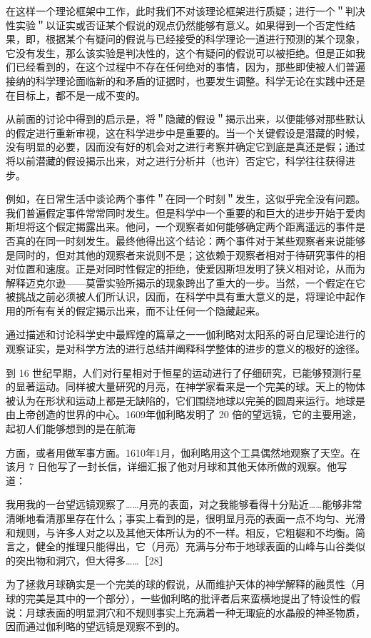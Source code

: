在这样一个理论框架中工作，此时我们不对该理论框架进行质疑；进行一个＂判决性实验＂以证实或否证某个假说的观点仍然能够有意义。如果得到一个否定性结果，即，根据某个有疑问的假说与已经接受的科学理论一道进行预测的某个现象，它没有发生，那么该实验是判决性的，这个有疑问的假说可以被拒绝。但是正如我们已经看到的，在这个过程中不存在任何绝对的事情，因为，那些即使被人们普遍接纳的科学理论面临新的和矛盾的证据时，也要发生调整。科学无论在实践中还是在目标上，都不是一成不变的。

从前面的讨论中得到的启示是，将＂隐藏的假设＂揭示出来，以便能够对那些默认的假定进行重新审视，这在科学进步中是重要的。当一个关键假设是潜藏的时候，没有明显的必要，因而没有好的机会对之进行考察并确定它到底是真还是假；通过将以前潜藏的假设揭示出来，对之进行分析并（也许）否定它，科学往往获得进步。

例如，在日常生活中谈论两个事件＂在同一个时刻＂发生，这似乎完全没有问题。我们普遍假定事件常常同时发生。但是科学中一个重要的和巨大的进步开始于爱肉斯坦将这个假定揭露出来。他问，一个观察者如何能够确定两个距离遥远的事件是否真的在同一时刻发生。最终他得出这个结论：两个事件对于某些观察者来说能够是同时的，但对其他的观察者来说则不是；这依赖于观察者相对于待研究事件的相对位置和速度。正是对同时性假定的拒绝，使爱因斯坦发明了狭义相对论，从而为解释迈克尔逊——莫雷实验所揭示的现象跨出了重大的一步。当然，一个假定在它被挑战之前必须被人们所认识，因而，在科学中具有重大意义的是，将理论中起作用的所有有关的假定揭示出来，而不让任何一个隐藏起来。

通过描述和讨论科学史中最辉煌的篇章之一一伽利略对太阳系的哥白尼理论进行的观察证实，是对科学方法的进行总结并阐释科学整体的进步的意义的极好的途径。

到 16 世纪早期，人们对行星相对于恒星的运动进行了仔细研究，已能够预测行星的显著运动。同样被大量研究的月亮，在神学家看来是一个完美的球。天上的物体被认为在形状和运动上都是无缺陷的，它们围绕地球以完美的圆周来运行。地球是由上帝创造的世界的中心。1609年伽利略发明了 20 倍的望远镜，它的主要用途，起初人们能够想到的是在航海

方面，或者用做军事方面。1610年1月，伽利略用这个工具偶然地观察了天空。在该月 7 日他写了一封长信，详细汇报了他对月球和其他天体所做的观察。他写道：

我用我的一台望远镜观察了……月亮的表面，对之我能够看得十分贴近……能够非常清晰地看清那里存在什么；事实上看到的是，很明显月亮的表面一点不均匀、光滑和规则，与许多人对之以及其他天体所认为的不一样。相反，它粗㯧和不均衡。简言之，健全的推理只能得出，它（月亮）充满与分布于地球表面的山峰与山谷类似的突出物和洞穴，但大得多……［28］

为了拯救月球确实是一个完美的球的假说，从而维护天体的神学解释的融贯性（月球的完美是其中的一个部分），一些伽利略的批评者后来蛮横地提出了特设性的假说：月球表面的明显洞穴和不规则事实上充满着一种无㻓疵的水晶般的神圣物质，因而通过伽利略的望远镜是观察不到的。

